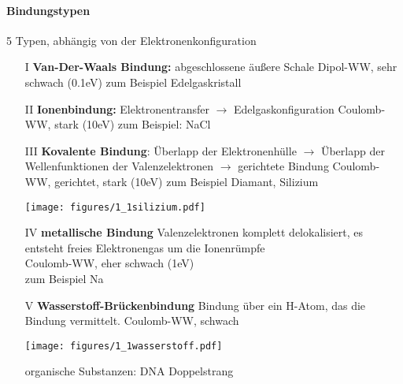 \paragraph{Bindungstypen}
	5 Typen, abhängig von der Elektronenkonfiguration
	\begin{itemize}
		\item[I] \textbf{Van-Der-Waals Bindung:}\newline
			abgeschlossene äußere Schale \newline
			Dipol-WW, sehr schwach (0.1eV)\newline
			zum Beispiel Edelgaskristall
		\item[II] \textbf{Ionenbindung:} \newline
			Elektronentransfer $\rightarrow$ Edelgaskonfiguration \newline
			Coulomb-WW, stark (10eV) \newline
			zum Beispiel: NaCl
		\item[III] \textbf{Kovalente Bindung}:\newline
			Überlapp der Elektronenhülle $\rightarrow$  Überlapp der Wellenfunktionen der Valenzelektronen\newline
			$\rightarrow$ gerichtete Bindung \newline
			Coulomb-WW, gerichtet, stark (10eV)\newline
			zum Beispiel Diamant, Silizium
			\begin{center}
				\texttt{[image: figures/1\_1silizium.pdf]}
			\end{center}
		\item[IV] \textbf{metallische Bindung}\newline
			Valenzelektronen komplett delokalisiert, es entsteht \glqq freies Elektronengas\grqq{}
			um die Ionenrümpfe \\
			Coulomb-WW, eher schwach (1eV)\\
			zum Beispiel Na
		\item[V] \textbf{Wasserstoff-Brückenbindung}\newline
			Bindung über ein H-Atom, das die Bindung vermittelt.\newline
			Coulomb-WW, schwach
			\begin{center}
				\texttt{[image: figures/1\_1wasserstoff.pdf]}
			\end{center}
			organische Substanzen: DNA Doppelstrang
	\end{itemize}

